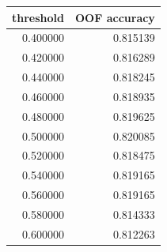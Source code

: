 \begin{tabular}{rr}
\toprule
threshold & OOF accuracy \\
\midrule
0.400000 & 0.815139 \\
0.420000 & 0.816289 \\
0.440000 & 0.818245 \\
0.460000 & 0.818935 \\
0.480000 & 0.819625 \\
0.500000 & 0.820085 \\
0.520000 & 0.818475 \\
0.540000 & 0.819165 \\
0.560000 & 0.819165 \\
0.580000 & 0.814333 \\
0.600000 & 0.812263 \\
\bottomrule
\end{tabular}

